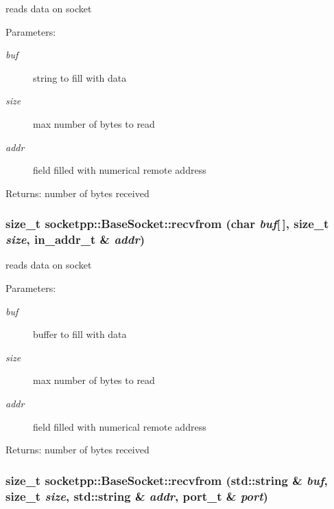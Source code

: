 \begin{CompactItemize}
reads data on socket 

\begin{Desc}
\item[Parameters:]
\begin{description}
\item[{\em buf}]string to fill with data \item[{\em size}]max number of bytes to read \item[{\em addr}]field filled with numerical remote address \end{description}
\end{Desc}
\begin{Desc}
\item[Returns:]number of bytes received \end{Desc}
\hypertarget{classsocketpp_1_1BaseSocket_ed28eb7e4a5abee65143bcdf162673f4}{
\subsubsection[{recvfrom}]{\setlength{\rightskip}{0pt plus 5cm}size\_\-t socketpp::BaseSocket::recvfrom (char {\em buf}\mbox{[}$\,$\mbox{]}, \/  size\_\-t {\em size}, \/  in\_\-addr\_\-t \& {\em addr})}}
\label{classsocketpp_1_1BaseSocket_ed28eb7e4a5abee65143bcdf162673f4}


reads data on socket 

\begin{Desc}
\item[Parameters:]
\begin{description}
\item[{\em buf}]buffer to fill with data \item[{\em size}]max number of bytes to read \item[{\em addr}]field filled with numerical remote address \end{description}
\end{Desc}
\begin{Desc}
\item[Returns:]number of bytes received \end{Desc}
\hypertarget{classsocketpp_1_1BaseSocket_259bb054a2abf0ffadf3c75bce4892b0}{
\subsubsection[{recvfrom}]{\setlength{\rightskip}{0pt plus 5cm}size\_\-t socketpp::BaseSocket::recvfrom (std::string \& {\em buf}, \/  size\_\-t {\em size}, \/  std::string \& {\em addr}, \/  {\bf port\_\-t} \& {\em port})}}
\label{classsocketpp_1_1BaseSocket_259bb054a2abf0ffadf3c75bce4892b0}



\end{CompactItemize}
